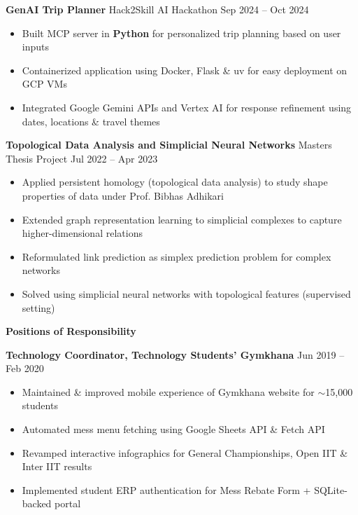 \documentclass[10pt,a4paper]{article}
\newcommand{\customsection}[1]{%
    \vspace{0.5em}
    \noindent\colorbox{sectionblue}{\parbox{\dimexpr\textwidth-2\fboxsep}{%
        \vspace{0.14em}\centering\textbf{\fontsize{10}{12}\selectfont #1}\vspace{0.14em}%
    }}
    \vspace{0.4em}
}
\begin{document}
\noindent\textbf{GenAI Trip Planner} \quad Hack2Skill AI Hackathon \hfill Sep 2024 -- Oct 2024
\begin{itemize}
    \item Built MCP server in \textbf{Python} for personalized trip planning based on user inputs
    \item Containerized application using Docker, Flask \& uv for easy deployment on GCP VMs
    \item Integrated Google Gemini APIs and Vertex AI for response refinement using dates, locations \& travel themes
\end{itemize}

\noindent\textbf{Topological Data Analysis and Simplicial Neural Networks} \quad Masters Thesis Project \hfill Jul 2022 -- Apr 2023
\begin{itemize}
    \item Applied persistent homology (topological data analysis) to study shape properties of data under Prof. Bibhas Adhikari
    \item Extended graph representation learning to simplicial complexes to capture higher-dimensional relations
    \item Reformulated link prediction as simplex prediction problem for complex networks
    \item Solved using simplicial neural networks with topological features (supervised setting)
\end{itemize}

\vspace{0.7em}

\customsection{Positions of Responsibility}

\noindent\textbf{Technology Coordinator, Technology Students' Gymkhana} \hfill Jun 2019 -- Feb 2020
\begin{itemize}
    \item Maintained \& improved mobile experience of Gymkhana website for $\sim$15,000 students
    \item Automated mess menu fetching using Google Sheets API \& Fetch API
    \item Revamped interactive infographics for General Championships, Open IIT \& Inter IIT results
    \item Implemented student ERP authentication for Mess Rebate Form + SQLite-backed portal
\end{itemize}

\vspace{0.7em}
\end{document}
